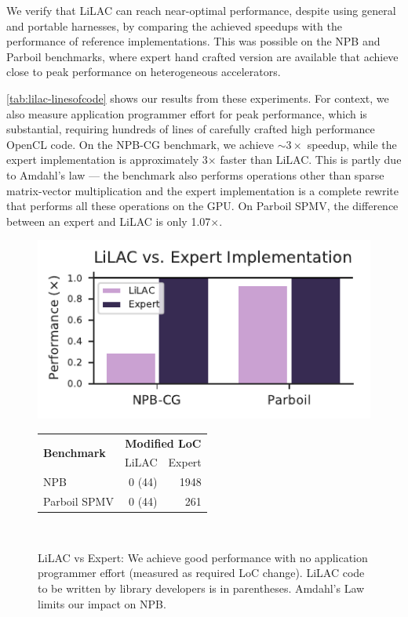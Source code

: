 We verify that LiLAC can reach near-optimal performance, despite using general
and portable harnesses, by comparing the achieved speedups with the performance
of reference implementations.
This was possible on the NPB and Parboil benchmarks, where expert hand
crafted version are available that achieve close to peak performance on
heterogeneous accelerators.


\autoref{tab:lilac-linesofcode} shows our results from these experiments.
For context, we also measure application programmer effort for peak performance,
which is substantial, requiring hundreds of lines of carefully crafted
high performance OpenCL code.
On the NPB-CG benchmark, we achieve $\sim 3\times$ speedup,
while the expert implementation is approximately 3$\times$ faster than LiLAC.
This is partly due to Amdahl's law --- the benchmark also performs operations
other than sparse matrix-vector multiplication and the expert implementation is
a complete rewrite that performs all these operations on the GPU.
On Parboil SPMV, the difference between an expert and LiLAC is only
1.07$\times$.

\begin{figure}[t]
  \centering
  \includegraphics[width=0.9\columnwidth,height=0.5\columnwidth]{figures/expert.pdf}
\\[0.5em]
  \begin{tabular}{lrr}
    \multirow{2}{*}{\textbf{Benchmark}} & \multicolumn{2}{c}{\textbf{Modified LoC}} \\
    & LiLAC & Expert \\
    \toprule
    \toprule
    NPB          & 0 (44) & 1948 \\
    Parboil SPMV & 0 (44) & 261
  \end{tabular}
\\[0.45em]
  \caption{LiLAC vs Expert: We achieve good performance with no application
           programmer effort (measured as required LoC change).
           LiLAC code to be written by library developers is in parentheses.
           Amdahl's Law limits our impact on NPB.
}
  \label{tab:lilac-linesofcode}
\end{figure}

